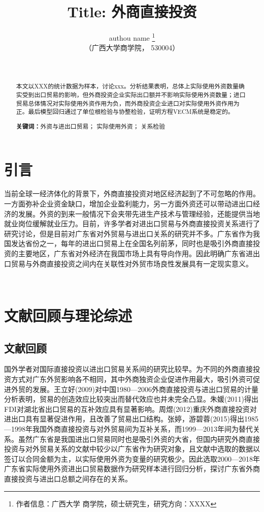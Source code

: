 \documentclass{article}
\title{\heiti Title: 外商直接投资}%
\author{\kaishu  authou name \thanks{ 作者信息：广西大学 商学院，硕士研究生，研究方向：XXXX} \\
					（广西大学商学院，  530004）   }
\date{\  }
\begin{document}
\maketitle %


\begin{abstract}
	\heiti 
	本文以XXX的统计数据为样本，讨论xxx。分析结果表明，总体上实际使用外资数量确实受到出口贸易的影响，但外商投资企业实际出口额并不影响实际使用外资数量；进口贸易总体情况对实际使用外资作用为负，而外商投资企业进口对实际使用外资作用为正。最后模型回归通过了单位根检验与协整检验，证明方程VECM系统是稳定的。
	
\par \textbf{关键词：}外资与进出口贸易；  实际使用外资；   关系检验 
\end{abstract}

{\normalsize 

\noindent  \section{引言}
\vspace{0.1cm}

当前全球一经济体化的背景下，外商直接投资对地区经济起到了不可忽略的作用。一方面弥补企业资金缺口，增加企业盈利能力，另一方面外资还可以带动进出口经济的发展。外资的到来一般情况下会夹带先进生产技术与管理经验，还能提供当地就业岗位缓解就业压力。目前，许多学者对进出口贸易与外商直接投资关系进行了研究讨论，但是目前对广东省对外贸易与进出口关系的研究并不多。广东省作为我国发达省份之一，每年的进出口贸易上在全国名列前茅，同时也是吸引外商直接投资的主要地区，广东省对外经济在我国市场上具有导向作用。因此明确广东省进出口贸易与外商直接投资之间内在关联性对外贸市场良性发展具有一定现实意义。


{\ }

\noindent   \section{文献回顾与理论综述}
\noindent  \subsection{文献回顾}
\vspace{0.1cm}

国外学者对国际直接投资以进出口贸易关系间的研究比较早。为不同的外商直接投资方式对广东外贸影响各不相同，其中外商独资企业促进作用最大，吸引外资可促进外贸的发展。王立好(2009)对中国1980—2006外商直接投资与进出口贸易的计量分析表明，贸易的创造效应比较突出而替代效应也并未完全凸显。朱媛(2011)得出FDI对湖北省出口贸易的互补效应具有显著影响。周煜(2012)重庆外商直接投资对进出口具有显著促进作用，且改善了贸易出口结构。张婷，游碧蓉(2015)得出1985—1998年我国外商直接投资与对外贸易间为互补关系，而1999—2013年间为替代关系。虽然广东省是我国进出口贸易同时也是吸引外资的大省，但国内研究外商直接投资与对外贸易关系的文献中较少以广东省作为研究对象，且文献中选取的数据以签订以合同金额为主，以实际使用外资为变量的研究极少。因此选取2000—2018年广东省实际使用外资进出口贸易数据作为研究样本进行回归分析，探讨广东省外商直接投资与进出口总额之间存在的关系。


}
\end{document}
